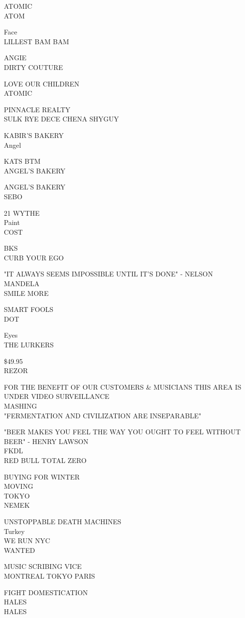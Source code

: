 \documentclass[10pt,letterpaper]{article}
\begin{document}
ATOMIC\\
ATOM

Face\\
LILLEST BAM BAM

ANGIE\\
DIRTY COUTURE

LOVE OUR CHILDREN\\
ATOMIC

PINNACLE REALTY\\
SULK RYE DECE CHENA SHYGUY

KABIR'S BAKERY\\
Angel

KATS BTM\\
ANGEL'S BAKERY

ANGEL'S BAKERY\\
SEBO

21 WYTHE\\
Paint\\
COST

BKS\\
CURB YOUR EGO

"IT ALWAYS SEEMS IMPOSSIBLE UNTIL IT'S DONE" {-} NELSON MANDELA\\
SMILE MORE

SMART FOOLS\\
DOT

Eyes\\
THE LURKERS

\$49.95\\
REZOR

FOR THE BENEFIT OF OUR CUSTOMERS \& MUSICIANS THIS AREA IS UNDER VIDEO SURVEILLANCE\\
MASHING\\
"FERMENTATION AND CIVILIZATION ARE INSEPARABLE"

"BEER MAKES YOU FEEL THE WAY YOU OUGHT TO FEEL WITHOUT BEER" {-} HENRY LAWSON\\
FKDL\\
RED BULL TOTAL ZERO

BUYING FOR WINTER\\
MOVING\\
TOKYO\\
NEMEK

UNSTOPPABLE DEATH MACHINES\\
Turkey\\
WE RUN NYC\\
WANTED

MUSIC SCRIBING VICE\\
MONTREAL TOKYO PARIS

FIGHT DOMESTICATION\\
HALES\\
HALES
\end{document}
